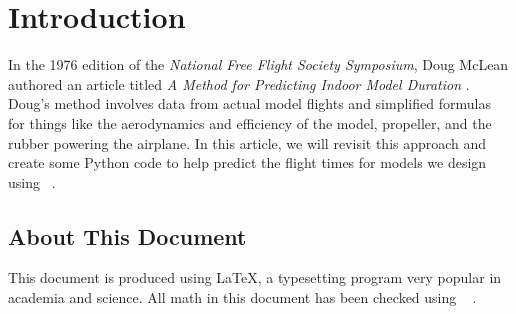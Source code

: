 \section{Introduction}

In the 1976 edition of the {\it National Free Flight Society Symposium}, Doug
McLean authored an article titled {\it A Method for Predicting Indoor Model
Duration} \cite{mclean}.  Doug's method involves data from actual model
flights and simplified formulas for things like the aerodynamics and efficiency
of the model, propeller,  and the rubber powering the airplane.  In this
article, we will revisit this approach and create some Python code to help
predict the flight times for models we design using \osc\ \cite{openscad}.

\subsection{About This Document}

This document is produced using \LaTeX, a typesetting program very popular in
academia and science. All math in this document has been checked using \PY\ %
\SYMPY.
